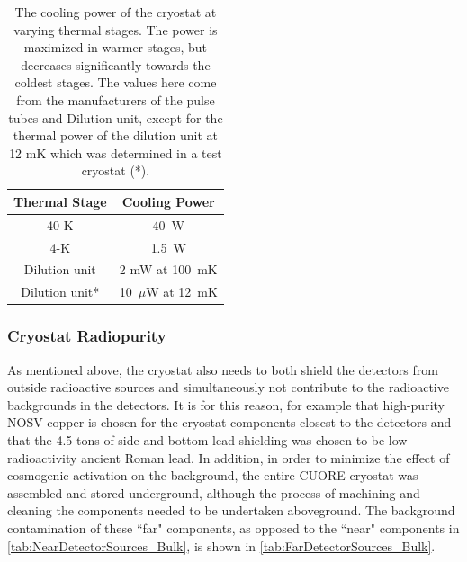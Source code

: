 \begin{table}[htbp]
    \centering
    \begin{tabular}{c|c}
    \hline
    \hline
    Thermal Stage     & Cooling Power \\
    \hline
    40-K     & 40~W \\
    4-K      & 1.5~W \\
    Dilution unit &  2 mW at 100~mK \\
    Dilution unit*    & 10~$\mu$W at 12~mK \\
    \hline
    \hline
    \end{tabular}
    \caption[The cooling power of the cryostat at varying thermal stages.]
    {The cooling power of the cryostat at varying thermal stages.
    The power is maximized in warmer stages, but decreases significantly towards the coldest stages.
    The values here come from the manufacturers of the pulse tubes and Dilution unit, except for the thermal power of the dilution unit at 12 mK which was determined in a test cryostat (*).}
    \label{tab:cryostat_cooling_power}
\end{table}
\subsubsection*{Cryostat Radiopurity}
\label{ssec:Cryostat_Radiopurity}
As mentioned above, the cryostat also needs to both shield the detectors from outside radioactive sources and simultaneously not contribute to the radioactive backgrounds in the detectors.
It is for this reason, for example that high-purity NOSV copper is chosen for the cryostat components closest to the detectors and that the 4.5 tons of side and bottom lead shielding was chosen to be low-radioactivity ancient Roman lead.
In addition, in order to minimize the effect of cosmogenic activation on the background, the entire CUORE cryostat was assembled and stored underground, although the process of machining and cleaning the components needed to be undertaken aboveground.
The background contamination of these ``far" components, as opposed to the ``near" components in \autoref{tab:NearDetectorSources_Bulk}, is shown in \autoref{tab:FarDetectorSources_Bulk}. 

